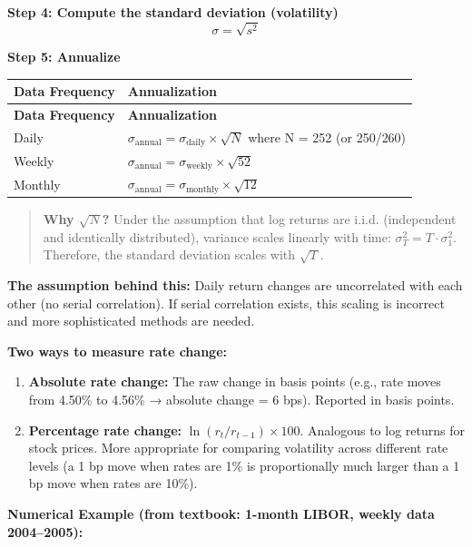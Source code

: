 \documentclass[12pt,openany]{book}
\theoremstyle{definition}
\theoremstyle{remark}
\begin{document}
\textbf{Step 4: Compute the standard deviation (volatility)} \[
\sigma = \sqrt{s^2}
\]

\textbf{Step 5: Annualize}

\begingroup
\footnotesize
\begin{longtable}{@{}L{0.27\textwidth}L{0.66\textwidth}@{}}
\toprule
\textbf{Data Frequency} & \textbf{Annualization} \\
\midrule
\endfirsthead
\toprule
\textbf{Data Frequency} & \textbf{Annualization} \\
\midrule
\endhead
Daily & $\sigma_{\text{annual}} = \sigma_{\text{daily}} \times \sqrt{N}$ where N = 252 (or 250/260) \\
Weekly & $\sigma_{\text{annual}} = \sigma_{\text{weekly}} \times \sqrt{52}$ \\
Monthly & $\sigma_{\text{annual}} = \sigma_{\text{monthly}} \times \sqrt{12}$ \\
\bottomrule
\end{longtable}
\endgroup
\begin{quote}
\textbf{Why $\sqrt{N}$?} Under the assumption that log returns are i.i.d. (independent and identically distributed), variance scales linearly with time: $\sigma^2_T = T \cdot \sigma^2_1$. Therefore, the standard deviation scales with $\sqrt{T}$.

\end{quote}
\textbf{The assumption behind this:} Daily return changes are uncorrelated with each other (no serial correlation). If serial correlation exists, this scaling is incorrect and more sophisticated methods are needed.

\textbf{Two ways to measure rate change:}

\begin{enumerate}
\item \textbf{Absolute rate change:} The raw change in basis points (e.g., rate moves from 4.50\% to 4.56\% → absolute change = 6 bps). Reported in basis points.


\item \textbf{Percentage rate change:} $\ln(r_t / r_{t-1}) \times 100$. Analogous to log returns for stock prices. More appropriate for comparing volatility across different rate levels (a 1 bp move when rates are 1\% is proportionally much larger than a 1 bp move when rates are 10\%).


\end{enumerate}
\textbf{Numerical Example (from textbook: 1-month LIBOR, weekly data 2004--2005):}
\end{document}
